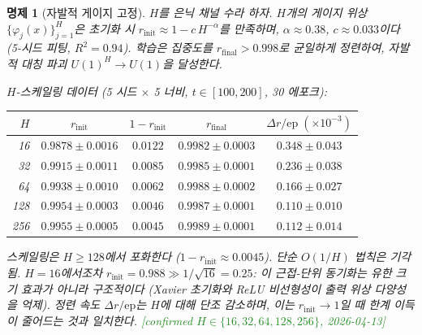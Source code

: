 \documentclass[11pt, a4paper]{article}
\theoremstyle{definition}
\theoremstyle{plain}
\newtheorem{proposition}[theorem]{명제}
\begin{document}
\begin{proposition}[자발적 게이지 고정]
\label{prop:spontaneous_gauge}
$H$를 은닉 채널 수라 하자.
$H$개의 게이지 위상 $\{\varphi_j(x)\}_{j=1}^H$은
초기화 시 $r_{\mathrm{init}} \approx 1 - c\,H^{-\alpha}$를 만족하며,
$\alpha \approx 0.38$, $c \approx 0.033$이다 (5-시드 피팅, $R^2=0.94$).
학습은 집중도를 $r_{\mathrm{final}} > 0.998$로 균일하게 정련하여,
자발적 대칭 파괴 $U(1)^H \to U(1)$을 달성한다.

\smallskip\noindent\textit{$H$-스케일링 데이터
(5 시드 $\times$ 5 너비, $t\in[100,200]$, 30 에포크):}

\smallskip
\begin{center}
\begin{tabular}{rcccc}
\toprule
$H$ & $r_{\mathrm{init}}$ & $1{-}r_{\mathrm{init}}$ &
      $r_{\mathrm{final}}$ & $\Delta r/\mathrm{ep}\;(\times 10^{-3})$ \\
\midrule
 16 & $0.9878\pm0.0016$ & $0.0122$ & $0.9982\pm0.0003$ & $0.348\pm0.043$ \\
 32 & $0.9915\pm0.0011$ & $0.0085$ & $0.9985\pm0.0001$ & $0.236\pm0.038$ \\
 64 & $0.9938\pm0.0010$ & $0.0062$ & $0.9988\pm0.0002$ & $0.166\pm0.027$ \\
128 & $0.9954\pm0.0003$ & $0.0046$ & $0.9987\pm0.0001$ & $0.110\pm0.010$ \\
256 & $0.9955\pm0.0005$ & $0.0045$ & $0.9989\pm0.0001$ & $0.112\pm0.014$ \\
\bottomrule
\end{tabular}
\end{center}

\smallskip\noindent
스케일링은 $H\ge128$에서 포화한다 ($1{-}r_{\mathrm{init}}\approx 0.0045$).
단순 $O(1/H)$ 법칙은 기각됨. $H=16$에서조차
$r_{\mathrm{init}}=0.988 \gg 1/\sqrt{16}=0.25$:
이 근접-단위 동기화는 유한 크기 효과가 아니라 \emph{구조적}이다
(Xavier 초기화와 ReLU 비선형성이 출력 위상 다양성을 억제).
정련 속도 $\Delta r/\mathrm{ep}$는 $H$에 대해 단조 감소하며,
이는 $r_{\mathrm{init}}\to 1$일 때 한계 이득이 줄어드는 것과 일치한다.
\textcolor{ForestGreen}{[confirmed $H{\in}\{16,32,64,128,256\}$,
2026-04-13]}
\end{proposition}
\end{document}
